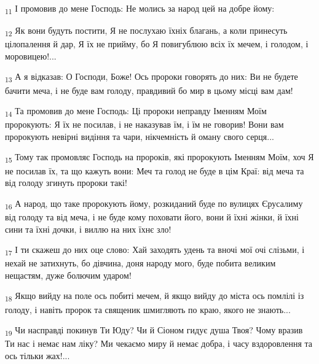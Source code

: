 \begin{tcolorbox}
\textsubscript{11} І промовив до мене Господь: Не молись за народ цей на добре йому:
\end{tcolorbox}
\begin{tcolorbox}
\textsubscript{12} Як вони будуть постити, Я не послухаю їхніх благань, а коли принесуть цілопалення й дар, Я їх не прийму, бо Я повигублюю всіх їх мечем, і голодом, і моровицею!...
\end{tcolorbox}
\begin{tcolorbox}
\textsubscript{13} А я відказав: О Господи, Боже! Ось пророки говорять до них: Ви не будете бачити меча, і не буде вам голоду, правдивий бо мир в цьому місці вам дам!
\end{tcolorbox}
\begin{tcolorbox}
\textsubscript{14} Та промовив до мене Господь: Ці пророки неправду Іменням Моїм пророкують: Я їх не посилав, і не наказував їм, і їм не говорив! Вони вам пророкують невірні видіння та чари, нікчемність й оману свого серця...
\end{tcolorbox}
\begin{tcolorbox}
\textsubscript{15} Тому так промовляє Господь на пророків, які пророкують Іменням Моїм, хоч Я не посилав їх, та що кажуть вони: Меч та голод не буде в цім Краї: від меча та від голоду згинуть пророки такі!
\end{tcolorbox}
\begin{tcolorbox}
\textsubscript{16} А народ, що таке пророкують йому, розкиданий буде по вулицях Єрусалиму від голоду та від меча, і не буде кому поховати його, вони й їхні жінки, й їхні сини та їхні дочки, і виллю на них їхнє зло!
\end{tcolorbox}
\begin{tcolorbox}
\textsubscript{17} І ти скажеш до них оце слово: Хай заходять удень та вночі мої очі слізьми, і нехай не затихнуть, бо дівчина, доня народу мого, буде побита великим нещастям, дуже болючим ударом!
\end{tcolorbox}
\begin{tcolorbox}
\textsubscript{18} Якщо вийду на поле ось побиті мечем, й якщо вийду до міста ось помлілі із голоду, і навіть пророк та священик шмигляють по краю, якого не знають...
\end{tcolorbox}
\begin{tcolorbox}
\textsubscript{19} Чи насправді покинув Ти Юду? Чи й Сіоном гидує душа Твоя? Чому вразив Ти нас і немає нам ліку? Ми чекаємо миру й немає добра, і часу вздоровлення та ось тільки жах!...
\end{tcolorbox}
